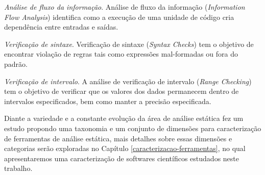 \begin{description}
  \item \textit{Análise de fluxo da informação}.
    Análise de fluxo da informação ({\it Information Flow Analysis}) identifica
    como a execução de uma unidade de código cria dependência entre entradas e
    saídas.

  \item \textit{Verificação de sintaxe}.
    Verificação de sintaxe ({\it Syntax Checks}) tem o objetivo de encontrar
    violação de regras tais como expressões mal-formadas ou fora do padrão.

  \item \textit{Verificação de intervalo}.
    A análise de verificação de intervalo ({\it Range Checking}) tem o objetivo
    de verificar que os valores dos dados permanecem dentro de intervalos
    especificados, bem como manter a precisão especificada.

\end{description}

Diante a variedade e a constante evolução da área de análise estática
 fez um estudo propondo uma taxonomia e um conjunto de
dimensões para caracterização de ferramentas de análise estática, mais detalhes
sobre essas dimensões e categorias serão exploradas no Capítulo
\ref{caracterizacao-ferramentas}, no qual apresentaremos uma caracterização de
softwares científicos estudados neste trabalho.


